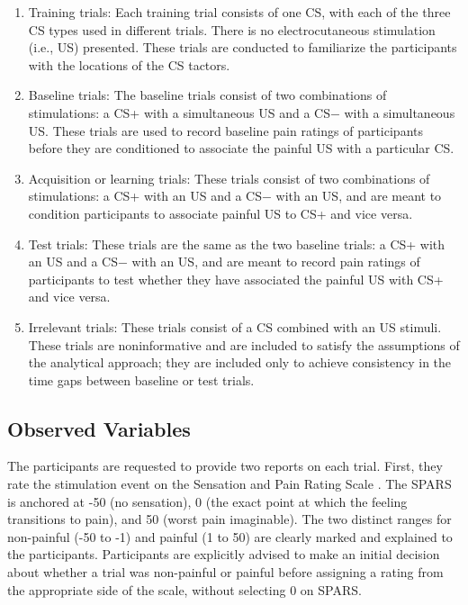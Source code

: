 \documentclass{jote-article}
\begin{document}
  \begin{enumerate}

  \item Training trials: Each training trial consists of one CS, with each of the three CS types used in different trials. There is no electrocutaneous stimulation (i.e., US) presented. These trials are conducted to familiarize the participants with the locations of the CS tactors.


  \item Baseline trials: The baseline trials consist of two combinations of stimulations: a CS+ with a simultaneous US and a CS− with a simultaneous US. These trials are used to record baseline pain ratings of participants before they are conditioned to associate the painful US with a particular CS.


  \item Acquisition or learning trials: These trials consist of two combinations of stimulations: a CS+ with an US and a CS− with an US, and are meant to condition participants to associate painful US to CS+ and vice versa.


  \item Test trials: These trials are the same as the two baseline trials: a CS+ with an US and a CS− with an US, and are meant to record pain ratings of participants to test whether they have associated the painful US with CS+ and vice versa.


  \item Irrelevant trials: These trials consist of a CS combined with an US stimuli. These trials are noninformative and are included to satisfy the assumptions of the analytical approach; they are included only to achieve consistency in the time gaps between baseline or test trials.


  

\end{enumerate}
\subsection{Observed Variables}

The participants are requested to provide two reports on each trial. First, they rate the stimulation event on the Sensation and Pain Rating Scale \cite{bibr44} \cite{bibr40}. The SPARS is anchored at -50 (no sensation), 0 (the exact point at which the feeling transitions to pain), and 50 (worst pain imaginable). The two distinct ranges for non-painful (-50 to -1) and painful (1 to 50) are clearly marked and explained to the participants. Participants are explicitly advised to make an initial decision about whether a trial was non-painful or painful before assigning a rating from the appropriate side of the scale, without selecting 0 on SPARS.
\end{document}
